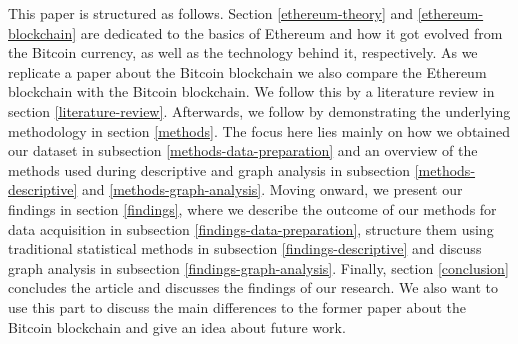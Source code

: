 This paper is structured as follows. 
Section \ref{ethereum-theory} and \ref{ethereum-blockchain} are dedicated to the basics of Ethereum and how it got evolved from the Bitcoin currency, as well as the technology behind it, respectively. 
As we replicate a paper about the Bitcoin blockchain \cite{lischke2016analyzing} we also compare the Ethereum blockchain with the Bitcoin blockchain. We follow this by a literature review in section \ref{literature-review}.
Afterwards, we follow by demonstrating the underlying methodology in section \ref{methods}. 
The focus here lies mainly on how we obtained our dataset in subsection \ref{methods-data-preparation} and an overview of the methods used during descriptive and graph analysis in subsection \ref{methods-descriptive} and \ref{methods-graph-analysis}. 
Moving onward, we present our findings in section \ref{findings}, where we describe the outcome of our methods for data acquisition in subsection \ref{findings-data-preparation}, structure them using traditional statistical methods in subsection \ref{findings-descriptive} and discuss graph analysis in subsection \ref{findings-graph-analysis}.
Finally, section \ref{conclusion} concludes the article and discusses the findings of our research. 
We also want to use this part to discuss the main differences to the former paper about the Bitcoin blockchain and give an idea about future work.
